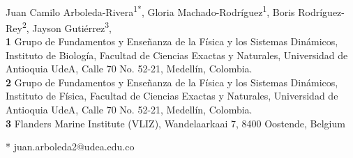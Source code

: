 \documentclass[10pt,letterpaper]{article}
\date{}
\begin{document}
\vspace*{0.2in}

\begin{flushleft}
{\Large
\textbf{}
}
\newline
\\
Juan Camilo Arboleda-Rivera\textsuperscript{1*},
Gloria Machado-Rodríguez\textsuperscript{1},
Boris Rodríguez-Rey\textsuperscript{2},
Jayson Gutiérrez\textsuperscript{3},
\\
\bigskip
\textbf{1} Grupo de Fundamentos y Enseñanza de la Física y los Sistemas Dinámicos,
Instituto de Biología, Facultad de Ciencias Exactas y Naturales, Universidad de Antioquia
UdeA, Calle 70 No. 52-21, Medellín, Colombia.
\\
\textbf{2} Grupo de Fundamentos y Enseñanza de la Física y los Sistemas Dinámicos,
Instituto de Física, Facultad de Ciencias Exactas y Naturales, Universidad de Antioquia
UdeA, Calle 70 No. 52-21, Medellín, Colombia.
\\
\textbf{3} Flanders Marine Institute (VLIZ), Wandelaarkaai 7, 8400 Oostende,
Belgium
\\
\bigskip

%
%





* juan.arboleda2@udea.edu.co

\end{flushleft}
\end{document}

